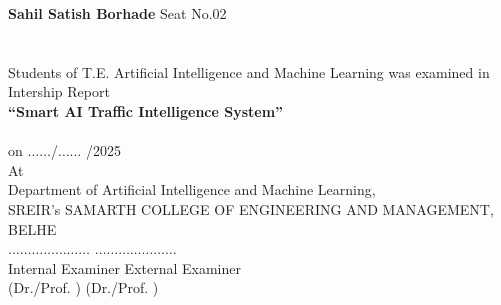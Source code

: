 \documentclass[12,Times new Roman,a4paper]{report}
\begin{document}
\begin{titlepage}
\begin{center}
\textbf{Sahil Satish Borhade}  \hspace{2.4cm} Seat No.02 \\ 
\\
\\
[0.3cm]
		\vspace{0.2in}
		{\small Students of T.E. Artificial Intelligence and Machine Learning  was examined in}\\
		{\small Intership Report }\\
		\vspace{0.3in}
		{\Large \bf {``Smart AI Traffic Intelligence System'' }}\\ 
		\vspace{0.2in}
		\\
		\vspace{0.1in}
		{on $\ldots$$\ldots$/$\ldots$$\ldots$ /2025}\\
		\vspace{0.1in}
		{At}\\
		{ Department of Artificial Intelligence and Machine Learning,}\\
		{ SREIR’s SAMARTH COLLEGE OF ENGINEERING AND MANAGEMENT,}\\
		{BELHE}\\
		\vspace{0.6in}
		\noindent
		\hspace*{0.3in}$\ldots\ldots\ldots\ldots\ldots\ldots\ldots $\hspace{1.9in} $\ldots\ldots\ldots\ldots\ldots\ldots\ldots $\\
		\hspace*{0.3in} Internal Examiner \hspace*{2.2in} External Examiner\\
		\hspace*{0.5in}(Dr./Prof. \hspace*{0.9in} ) \hspace*{2.1in}(Dr./Prof. \hspace*{0.9in} )\\
		\vspace{0.3in}
		\end{center}
		
	\end{titlepage}
\end{document}
